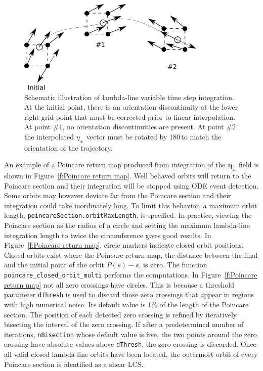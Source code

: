 \documentclass{article}
\begin{document}
\begin{figure}
\begin{center}
\includegraphics[width=0.8\textwidth]{graphics/variable_step_integration}
\end{center}
\caption{Schematic illustration of lambda-line variable time step integration. At the initial point, there is an orientation discontinuity at the lower right grid point that must be corrected prior to linear interpolation. At point \#1, no orientation discontinuities are present. At point \#2 the interpolated $\eta_\pm$ vector must be rotated by 180\degree\,to match the orientation of the trajectory.}
\label{f:variable step integration}
\end{figure}

An example of a Poincare return map produced from integration of the $\boldsymbol \eta_\pm$ field is shown in Figure~\ref{f:Poincare return map}. Well behaved orbits will return to the Poincare section and their integration will be stopped using ODE event detection. Some orbits may however deviate far from the Poincare section and their integration could take inordinately long. To limit this behavior, a maximum orbit length, \lstinline!poincareSection.orbitMaxLength!, is specified. In practice, viewing the Poincare section as the radius of a circle and setting the maximum lambda-line integration length to twice the circumference gives good results. In Figure~\ref{f:Poincare return map}, circle markers indicate closed orbit positions. Closed orbits exist where the Poincare return map, the distance between the final and the initial point of the orbit $P(s)-s$, is zero. The function \lstinline!poincare_closed_orbit_multi! performs the computations. In Figure~\ref{f:Poincare return map} not all zero crossings have circles. This is because a threshold parameter \lstinline!dThresh! is used to discard those zero crossings that appear in regions with high numerical noise. Its default value is 1\% of the length of the Poincare section. The position of each detected zero crossing is refined by iteratively bisecting the interval of the zero crossing. If after a predetermined number of iterations, \lstinline!nBisection! whose default value is five, the two points around the zero crossing have absolute values above \lstinline!dThresh!, the zero crossing is discarded. Once all valid closed lambda-line orbits have been located, the outermost orbit of every Poincare section is identified as a shear LCS.
\end{document}
